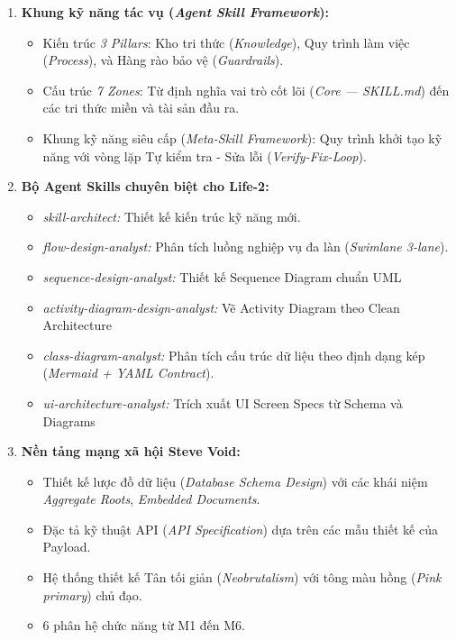 \documentclass[13pt,a4paper,oneside]{extreport}
\numberwithin{equation}{chapter}
\numberwithin{figure}{chapter}
\numberwithin{table}{chapter}
\begin{document}
\begin{enumerate}
    \item \textbf{Khung kỹ năng tác vụ (\textit{Agent Skill Framework}):}
    \begin{itemize}
        \item Kiến trúc \textit{3 Pillars}: Kho tri thức (\textit{Knowledge}), Quy trình làm việc (\textit{Process}), và Hàng rào bảo vệ (\textit{Guardrails}).
        \item Cấu trúc \textit{7 Zones}: Từ định nghĩa vai trò cốt lõi (\textit{Core — SKILL.md}) đến các tri thức miền và tài sản đầu ra.
        \item Khung kỹ năng siêu cấp (\textit{Meta-Skill Framework}): Quy trình khởi tạo kỹ năng với vòng lặp Tự kiểm tra - Sửa lỗi (\textit{Verify-Fix-Loop}).
    \end{itemize}

    \item \textbf{Bộ Agent Skills chuyên biệt cho Life-2:}
    \begin{itemize}
        \item \textit{skill-architect:} Thiết kế kiến trúc kỹ năng mới.
        \item \textit{flow-design-analyst:} Phân tích luồng nghiệp vụ đa làn (\textit{Swimlane 3-lane}).
        \item \textit{sequence-design-analyst:} Thiết kế Sequence Diagram chuẩn UML
        \item \textit{activity-diagram-design-analyst:} Vẽ Activity Diagram theo Clean Architecture
        \item \textit{class-diagram-analyst:} Phân tích cấu trúc dữ liệu theo định dạng kép (\textit{Mermaid + YAML Contract}).
        \item \textit{ui-architecture-analyst:} Trích xuất UI Screen Specs từ Schema và Diagrams
    \end{itemize}

    \item \textbf{Nền tảng mạng xã hội Steve Void:}
    \begin{itemize}
        \item Thiết kế lược đồ dữ liệu (\textit{Database Schema Design}) với các khái niệm \textit{Aggregate Roots}, \textit{Embedded Documents}.
        \item Đặc tả kỹ thuật API (\textit{API Specification}) dựa trên các mẫu thiết kế của Payload.
        \item Hệ thống thiết kế Tân tối giản (\textit{Neobrutalism}) với tông màu hồng (\textit{Pink primary}) chủ đạo.
        \item 6 phân hệ chức năng từ M1 đến M6.
    \end{itemize}


\end{enumerate}
\end{document}
